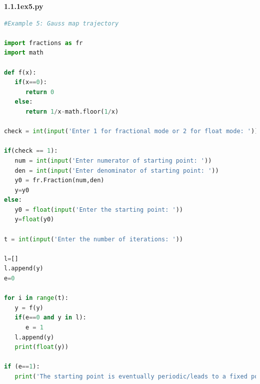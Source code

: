 \documentclass[11pt]{article}
\begin{document}
      \vspace{10mm}
      \textbf{1.1.1ex5.py}
      \begin{lstlisting}[backgroundcolor = \color{mygray},breaklines=true,language=Python]
#Example 5: Gauss map trajectory

import fractions as fr
import math

def f(x):
   if(x==0):
      return 0
   else:
      return 1/x-math.floor(1/x)

check = int(input('Enter 1 for fractional mode or 2 for float mode: '))

if(check == 1):
   num = int(input('Enter numerator of starting point: '))
   den = int(input('Enter denominator of starting point: '))
   y0 = fr.Fraction(num,den)
   y=y0
else:
   y0 = float(input('Enter the starting point: '))
   y=float(y0)

t = int(input('Enter the number of iterations: '))

l=[]
l.append(y)
e=0

for i in range(t):
   y = f(y)
   if(e==0 and y in l):
      e = 1
   l.append(y)
   print(float(y))

if (e==1):
   print('The starting point is eventually periodic/leads to a fixed point')


      \end{lstlisting}
\end{document}
